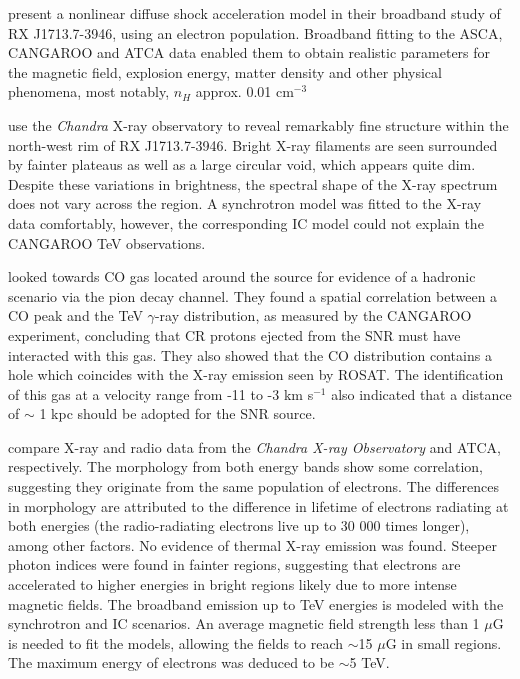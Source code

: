 \documentclass[12pt,a4paper]{article}
\begin{document}
\cite{2001ApJ...563..191E} present a nonlinear diffuse shock acceleration model in their broadband study of RX J1713.7-3946, using an electron population. Broadband fitting to the ASCA, CANGAROO and ATCA data enabled them to obtain realistic parameters for the magnetic field, explosion energy, matter density and other physical phenomena, most notably, $n_H$ approx. 0.01 cm$^{-3}$

\cite{2003A&A...400..567U} use the \textit{Chandra} X-ray observatory to reveal remarkably fine structure within the north-west rim of RX J1713.7-3946. Bright X-ray filaments are seen surrounded by fainter plateaus as well as a large circular void, which appears quite dim. Despite these variations in brightness, the spectral shape of the X-ray spectrum does not vary across the region. A synchrotron model was fitted to the X-ray data comfortably, however, the corresponding IC model could not explain the CANGAROO TeV observations. 

\cite{2003PASJ...55L..61F} looked towards CO gas located around the source for evidence of a hadronic scenario via the pion decay channel. They found a spatial correlation between a CO peak and the TeV $\gamma$-ray distribution, as measured by the CANGAROO experiment, concluding that CR protons ejected from the SNR must have interacted with this gas. They also showed that the CO distribution contains a hole which coincides with the X-ray emission seen by ROSAT. The identification of this gas at a velocity range from -11 to -3 km s$^{-1}$ also indicated that a distance of $\sim$ 1 kpc should be adopted for the SNR source.

\cite{2004ApJ...602..271L} compare X-ray and radio data from the \textit{Chandra X-ray Observatory} and ATCA, respectively. The morphology from both energy bands show some correlation, suggesting they originate from the same population of electrons. The differences in morphology are attributed to the difference in lifetime of electrons radiating at both energies (the radio-radiating electrons live up to 30 000 times longer), among other factors. No evidence of thermal X-ray emission was found. Steeper photon indices were found in fainter regions, suggesting that electrons are accelerated to higher energies in bright regions likely due to more intense magnetic fields. The broadband emission up to TeV energies is modeled with the synchrotron and IC scenarios. An average magnetic field strength less than 1 $\mu$G is needed to fit the models, allowing the fields to reach $\sim$15 $\mu$G in small regions. The maximum energy of electrons was deduced to be $\sim$5 TeV. 
\end{document}
